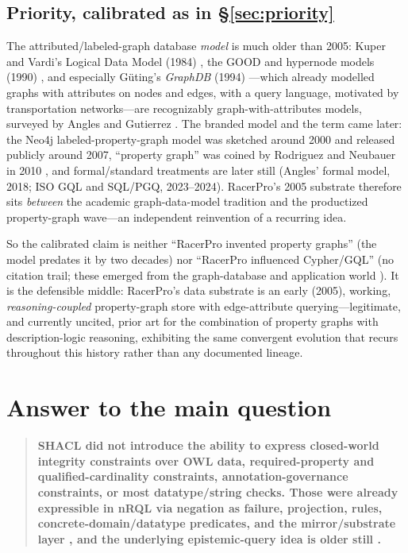 \documentclass[11pt,letterpaper]{article}
\theoremstyle{definition}
\newcommand{\nrql}{nRQL}
\newcommand{\racer}{RacerPro}
\newcommand{\shacl}{SHACL}
\newcommand{\naf}{negation as failure}
\newcommand{\owl}{OWL}
\begin{document}
\subsection{Priority, calibrated as in \S\ref{sec:priority}}
The attributed/labeled-graph database \emph{model} is much older than 2005: Kuper and Vardi's Logical Data Model (1984) \cite{kupervardi}, the GOOD and hypernode models (1990) \cite{levene}, and especially G\"uting's \emph{GraphDB} (1994) \cite{guting}---which already modelled graphs with attributes on nodes and edges, with a query language, motivated by transportation networks---are recognizably graph-with-attributes models, surveyed by Angles and Gutierrez \cite{angles2008}. The branded model and the term came later: the Neo4j labeled-property-graph model was sketched around 2000 and released publicly around 2007, ``property graph'' was coined by Rodriguez and Neubauer in 2010 \cite{rodriguez2010}, and formal/standard treatments are later still (Angles' formal model, 2018; ISO GQL and SQL/PGQ, 2023--2024). \racer{}'s 2005 substrate therefore sits \emph{between} the academic graph-data-model tradition and the productized property-graph wave---an independent reinvention of a recurring idea.

So the calibrated claim is neither ``\racer{} invented property graphs'' (the model predates it by two decades) nor ``\racer{} influenced Cypher/GQL'' (no citation trail; these emerged from the graph-database and application world \cite{cypher2018}). It is the defensible middle: \racer{}'s data substrate is an early (2005), working, \emph{reasoning-coupled} property-graph store with edge-attribute querying---legitimate, and currently uncited, prior art for the combination of property graphs with description-logic reasoning, exhibiting the same convergent evolution that recurs throughout this history rather than any documented lineage.

\section{Answer to the main question}\label{sec:answer}

\begin{quote}
\textbf{\shacl{} did not introduce the ability to express closed-world integrity constraints over \owl{} data, required-property and qualified-cardinality constraints, annotation-governance constraints, or most datatype/string checks. Those were already expressible in \nrql{} via \naf{}, projection, rules, concrete-domain/datatype predicates, and the mirror/substrate layer \cite{adl04,nrql05,racerug}, and the underlying epistemic-query idea is older still \cite{epistemic,mknf}.}
\end{quote}
\end{document}
